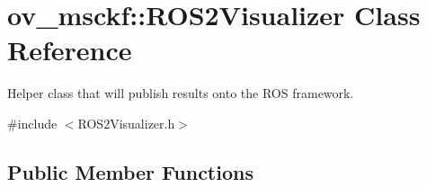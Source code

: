 \hypertarget{classov__msckf_1_1ROS2Visualizer}{}\section{ov\+\_\+msckf\+:\+:R\+O\+S2\+Visualizer Class Reference}
\label{classov__msckf_1_1ROS2Visualizer}


Helper class that will publish results onto the R\+OS framework.  




{\ttfamily \#include $<$R\+O\+S2\+Visualizer.\+h$>$}

\subsection*{Public Member Functions}
